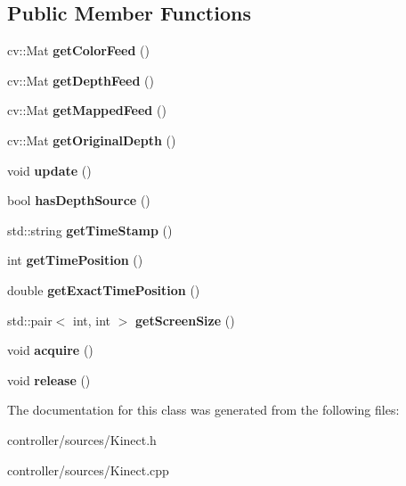 \subsection*{Public Member Functions}
\begin{DoxyCompactItemize}
\item 
\mbox{\label{class_kinect_a006fb9582a33bbc026834d34850c598c}} 
cv\+::\+Mat {\bfseries get\+Color\+Feed} ()
\item 
\mbox{\label{class_kinect_a2bc9f0dfe1117b46d1eb3740440a3a17}} 
cv\+::\+Mat {\bfseries get\+Depth\+Feed} ()
\item 
\mbox{\label{class_kinect_a0fab505f071a67d74b5124b1b8ef4fa1}} 
cv\+::\+Mat {\bfseries get\+Mapped\+Feed} ()
\item 
\mbox{\label{class_kinect_a8ff1afb85ee20e7bab9de5e13c3a9575}} 
cv\+::\+Mat {\bfseries get\+Original\+Depth} ()
\item 
\mbox{\label{class_kinect_a4b5ae8c02d4bfacff8a23fe2902da4b5}} 
void {\bfseries update} ()
\item 
\mbox{\label{class_kinect_abd18c649734b641a762fe33ec1df5836}} 
bool {\bfseries has\+Depth\+Source} ()
\item 
\mbox{\label{class_kinect_a3ed4b60fa61c3d5061a959d6b49b0851}} 
std\+::string {\bfseries get\+Time\+Stamp} ()
\item 
\mbox{\label{class_kinect_a1181d62f878e3eb681e76e7d8b7300f5}} 
int {\bfseries get\+Time\+Position} ()
\item 
\mbox{\label{class_kinect_a2588ce6e74cf51ffaa3fe3829042dff2}} 
double {\bfseries get\+Exact\+Time\+Position} ()
\item 
\mbox{\label{class_kinect_a39e9733b24bf29059fc36fbd7accc24c}} 
std\+::pair$<$ int, int $>$ {\bfseries get\+Screen\+Size} ()
\item 
\mbox{\label{class_kinect_a895813d18b5feb49ec0aa5358d3479df}} 
void {\bfseries acquire} ()
\item 
\mbox{\label{class_kinect_ab7736670c3d00426cb9ea12691eeb27f}} 
void {\bfseries release} ()
\end{DoxyCompactItemize}


The documentation for this class was generated from the following files\+:\begin{DoxyCompactItemize}
\item 
controller/sources/Kinect.\+h\item 
controller/sources/Kinect.\+cpp\end{DoxyCompactItemize}

